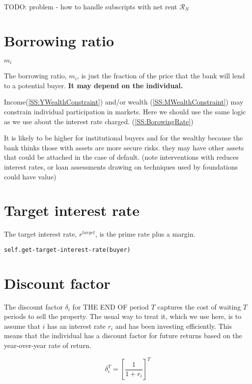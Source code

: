 TODO: problem - how to handle subscripts with net rent $\mathcal{R}_N$



\section{Borrowing ratio}\label{SS:BorrowingRatio}
$m_i$

The borrowing ratio, $m_i$, is just the fraction of the price that the bank will lend to a potential buyer. \textbf{It may depend on the individual.} 

Income(\ref{SS:YWealthConstraint}) and/or wealth (\ref {SS:MWealthConstraint}) may constrain individual participation in markets. 
Here we should use the same logic as we use about the interest rate charged. (\ref{SS:BorowingRate})

It is likely to be higher for institutional buyers  and for the wealthy because the bank thinks those with assets are more secure risks. they may have other assets that could be attached in the case of default.
(note interventions with reduces interest rates, or loan assessments drawing on techniques used by foundations could have value)


\section{Target interest rate}\label{SS:targetr}

 The target interest rate, $r^{target}$, is the prime rate plus a margin. %

\begin{verbatim}
self.get-target-interest-rate(buyer)
\end{verbatim}



\section{Discount factor}\label{SS:discountfactor}

The discount factor $\delta_i$ for THE END OF period $T$ captures the cost of waiting $T$ periods to sell the property. The usual way to treat it, which we use here, is to assume that $i$ has an interest rate $r_i$ and has been investing efficiently. This means that  the individual has a discount factor for future returns based on the year-over-year rate of return. 

\[\delta^T_i=\left[\frac{1}{1+r_i}\right]^T\]



